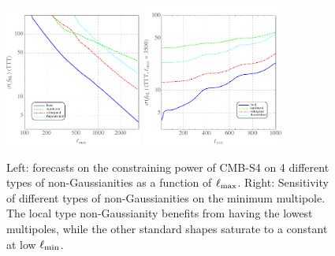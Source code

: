 \begin{figure}[ht]
\centering
\includegraphics[width=0.4\textwidth]{Inflation/DeltaFNL_TTT}
\includegraphics[width=0.415\textwidth]{Inflation/DeltaFNL_TTT_lmin}
\caption{Left: forecasts on the constraining power of CMB-S4 on 4 different types of non-Gaussianities as a function of $\ell_{\rm max}$. Right: Sensitivity of different types of non-Gaussianities on the minimum multipole. The local type non-Gaussianity benefits from having the lowest multipoles, while the other standard shapes saturate to a constant at low $\ell_{\rm min}$. }
\label{fig_fnlforecast}
\end{figure}




 
